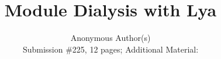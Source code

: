 \documentclass[letterpaper,twocolumn,10pt]{article}
\begin{document}

\date{}

\title{\Large \bf Module Dialysis with Lya}

\author{
{\rm Anonymous Author(s)}\\
Submission \#225, 12 pages; Additional Material:
}

\maketitle
\end{document}
